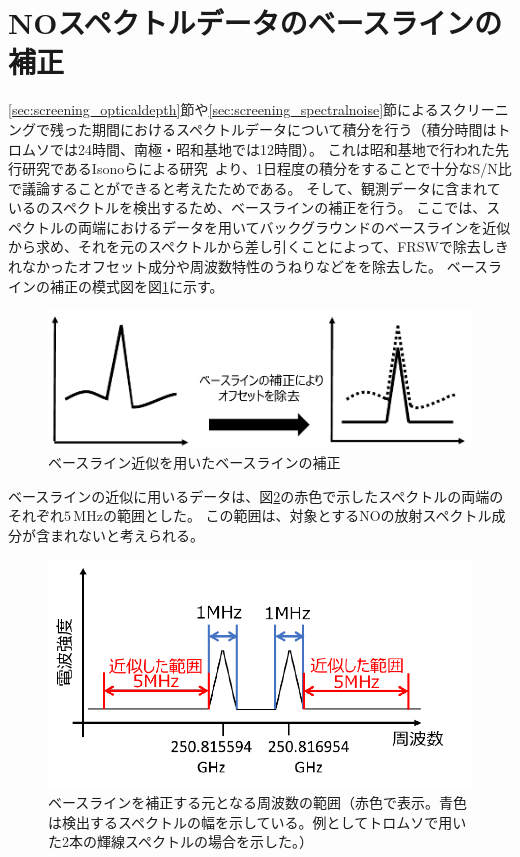 \section{NOスペクトルデータのベースラインの補正}
\label{sec:correction_baselinefitting}
\ref{sec:screening_opticaldepth}節や\ref{sec:screening_spectralnoise}節によるスクリーニングで残った期間におけるスペクトルデータについて積分を行う（積分時間はトロムソでは24時間、南極・昭和基地では12時間）。
これは昭和基地で行われた先行研究であるIsonoらによる研究~\cite{isono2014ground}より、1日程度の積分をすることで十分なS/N比で議論することができると考えたためである。
そして、観測データに含まれているのスペクトルを検出するため、ベースラインの補正を行う。
ここでは、スペクトルの両端におけるデータを用いてバックグラウンドのベースラインを近似から求め、それを元のスペクトルから差し引くことによって、FRSWで除去しきれなかったオフセット成分や周波数特性のうねりなどをを除去した。
ベースラインの補正の模式図を図\ref{fig:baseline_correct_schema}に示す。
\begin{figure}[htbp]
    \centering
    \includegraphics[width=\linewidth]{master_thesis_contents/master_thesis_fig/baseline_correct_schema.pdf}
    \caption{ベースライン近似を用いたベースラインの補正}
    \label{fig:baseline_correct_schema}
\end{figure}
ベースラインの近似に用いるデータは、図\ref{fig:baseline_range}の赤色で示したスペクトルの両端のそれぞれ$5\, \mathrm{MHz}$の範囲とした。
この範囲は、対象とするNOの放射スペクトル成分が含まれないと考えられる。
\begin{figure}[htbp]
    \centering
    \includegraphics[width=\linewidth]{master_thesis_contents/master_thesis_fig/baseline_range.pdf}
    \caption{ベースラインを補正する元となる周波数の範囲（赤色で表示。青色は検出するスペクトルの幅を示している。例としてトロムソで用いた2本の輝線スペクトルの場合を示した。）}
    \label{fig:baseline_range}
\end{figure}

